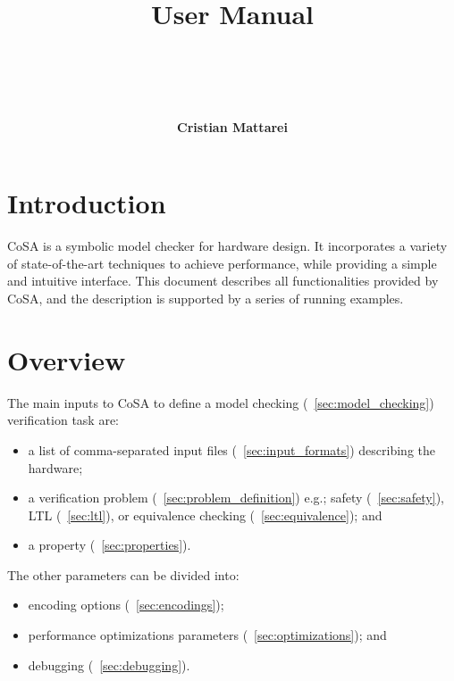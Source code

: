 \documentclass{article}
\theoremstyle{definition}
\begin{document}
\title{\\ \vspace{1cm}User Manual}
\author{\\ \\ \\ \\ \textbf{Cristian Mattarei}}

\maketitle

\newpage
\tableofcontents

\newpage
\section*{Introduction}

CoSA is a symbolic model checker for hardware design. It incorporates
a variety of state-of-the-art techniques to achieve performance, while
providing a simple and intuitive interface. This document describes
all functionalities provided by CoSA, and the description is supported
by a series of running examples.

\section{Overview}

The main inputs to CoSA to define a model checking
(\textsection~\ref{sec:model_checking}) verification task are:
\begin{itemize}
\item a list of comma-separated input files
  (\textsection~\ref{sec:input_formats}) describing the hardware;
\item a verification problem
  (\textsection~\ref{sec:problem_definition}) e.g.; safety
  (\textsection~\ref{sec:safety}), LTL (\textsection~\ref{sec:ltl}),
  or equivalence checking (\textsection~\ref{sec:equivalence}); and
\item a property (\textsection~\ref{sec:properties}).
\end{itemize}

\noindent
The other parameters can be divided into:
\begin{itemize}
\item encoding options (\textsection~\ref{sec:encodings});
\item performance optimizations parameters
  (\textsection~\ref{sec:optimizations}); and
\item debugging (\textsection~\ref{sec:debugging}).
\end{itemize}
\end{document}
